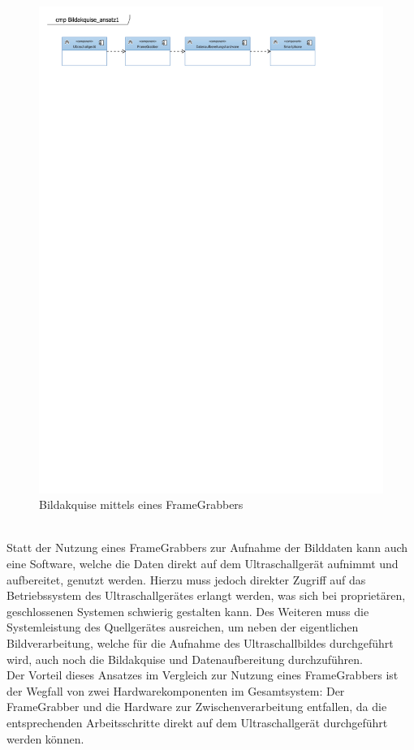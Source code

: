 \begin{figure}[h]
	\centering
	\includegraphics[width=1\textwidth]{Bilder/BildakquiseUndDatenaufbereitung/Bildakquise_ansatz1.pdf}
	\caption{Bildakquise mittels eines FrameGrabbers}
	\label{fig:Bildakquise_ansatz1}
\end{figure}

~\\
Statt der Nutzung eines FrameGrabbers zur Aufnahme der Bilddaten kann auch eine Software, welche die Daten direkt auf dem Ultraschallgerät  aufnimmt und aufbereitet, genutzt werden. Hierzu muss jedoch direkter Zugriff auf das Betriebssystem des Ultraschallgerätes erlangt werden, was sich bei proprietären, geschlossenen Systemen schwierig gestalten kann. Des Weiteren muss die Systemleistung des Quellgerätes ausreichen, um neben der eigentlichen Bildverarbeitung, welche für die Aufnahme des Ultraschallbildes durchgeführt wird, auch noch die Bildakquise und Datenaufbereitung durchzuführen.\\
Der Vorteil dieses Ansatzes im Vergleich zur Nutzung eines FrameGrabbers ist der Wegfall von zwei Hardwarekomponenten im Gesamtsystem: Der FrameGrabber und die Hardware zur Zwischenverarbeitung entfallen, da die entsprechenden Arbeitsschritte direkt auf dem Ultraschallgerät durchgeführt werden können.

